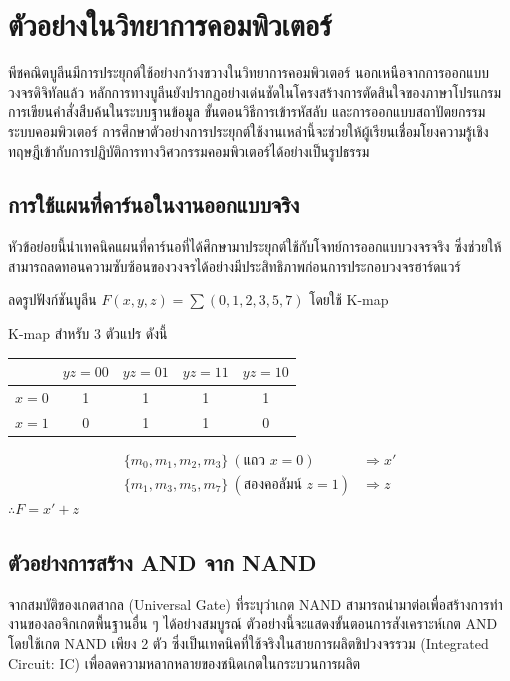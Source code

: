 \section{ตัวอย่างในวิทยาการคอมพิวเตอร์}
\label{sec:computer-science-examples}

พีชคณิตบูลีนมีการประยุกต์ใช้อย่างกว้างขวางในวิทยาการคอมพิวเตอร์ นอกเหนือจากการออกแบบวงจรดิจิทัลแล้ว หลักการทางบูลีนยังปรากฏอย่างเด่นชัดในโครงสร้างการตัดสินใจของภาษาโปรแกรม การเขียนคำสั่งสืบค้นในระบบฐานข้อมูล ขั้นตอนวิธีการเข้ารหัสลับ และการออกแบบสถาปัตยกรรมระบบคอมพิวเตอร์ การศึกษาตัวอย่างการประยุกต์ใช้งานเหล่านี้จะช่วยให้ผู้เรียนเชื่อมโยงความรู้เชิงทฤษฎีเข้ากับการปฏิบัติการทางวิศวกรรมคอมพิวเตอร์ได้อย่างเป็นรูปธรรม~\parencite{gersting2014structures}

\subsection{การใช้แผนที่คาร์นอในงานออกแบบจริง}
หัวข้อย่อยนี้นำเทคนิคแผนที่คาร์นอที่ได้ศึกษามาประยุกต์ใช้กับโจทย์การออกแบบวงจรจริง ซึ่งช่วยให้สามารถลดทอนความซับซ้อนของวงจรได้อย่างมีประสิทธิภาพก่อนการประกอบวงจรฮาร์ดแวร์~\parencite{roth2021logic}

\begin{ex}
\label{ex:kmap-real-design}
ลดรูปฟังก์ชันบูลีน $F(x,y,z) = \sum(0,1,2,3,5,7)$ โดยใช้ K-map

K-map สำหรับ 3 ตัวแปร ดังนี้


\begin{center}
\begin{tabular}{c|c|c|c|c}
\hline
 & $yz=00$ & $yz=01$ & $yz=11$ & $yz=10$ \\
\hline
$x=0$ & 1 & 1 & 1 & 1 \\
\hline
$x=1$ & 0 & 1 & 1 & 0 \\
\hline
\end{tabular}
\end{center}
\end{ex}
\begin{solution}
\begin{align*}
\{m_0, m_1, m_2, m_3\}\ (\text{แถว } x = 0) &\Rightarrow x'\\
\{m_1, m_3, m_5, m_7\}\ (\text{สองคอลัมน์ } z = 1) &\Rightarrow z
\end{align*}
$\therefore F = x' + z$ \solhere
\end{solution}


\subsection{ตัวอย่างการสร้าง AND จาก NAND}
จากสมบัติของเกตสากล (Universal Gate) ที่ระบุว่าเกต NAND สามารถนำมาต่อเพื่อสร้างการทำงานของลอจิกเกตพื้นฐานอื่น ๆ ได้อย่างสมบูรณ์ ตัวอย่างนี้จะแสดงขั้นตอนการสังเคราะห์เกต AND โดยใช้เกต NAND เพียง 2 ตัว ซึ่งเป็นเทคนิคที่ใช้จริงในสายการผลิตชิปวงจรรวม (Integrated Circuit: IC) เพื่อลดความหลากหลายของชนิดเกตในกระบวนการผลิต~\parencite{mano2018digital}

